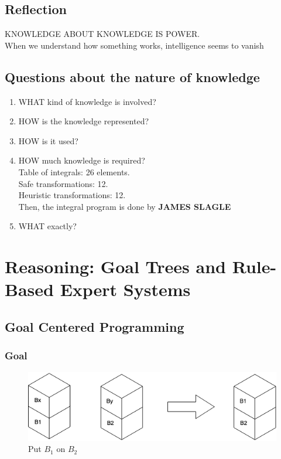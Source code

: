 \documentclass[12pt]{book}
\begin{document}
\subsection{Reflection}
KNOWLEDGE ABOUT KNOWLEDGE IS POWER.\\
\indent When we understand how something works, intelligence seems to vanish
\subsection{Questions about the nature of knowledge}
\begin{enumerate}
	\item WHAT kind of knowledge is involved?
	\item HOW is the knowledge represented?
	\item HOW is it used?
	\item HOW much knowledge is required?\\
	Table of integrals: 26 elements.\\
	Safe transformations: 12.\\
	Heuristic transformations: 12.\\
	Then, the integral program is done by \textbf{JAMES SLAGLE} 
	\item WHAT exactly?
\end{enumerate}
\newpage

\section{Reasoning: Goal Trees and Rule-Based Expert Systems}
\subsection{Goal Centered Programming}
\subsubsection{Goal}
\begin{figure}[ht]
	\centering
	\includegraphics[scale=0.8]{Figure/Figure3_1.png}
	\caption{Put $B_1$ on $B_2$}
\end{figure}
\end{document}

